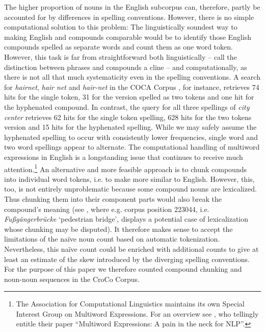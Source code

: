 \documentclass[output=paper]{LSP/langsci}
\begin{document}
\largerpage%
The higher proportion of nouns in the English subcorpus can, therefore, partly be accounted for by differences in spelling conventions. However, there is no simple computational solution to this problem: The linguistically soundest way to making English and  compounds comparable would be to identify those English compounds spelled as separate words and count them as one word token. However, this task is far from straightforward both linguistically -- \citet[589]{Biber1999} call the distinction between phrases and compounds a cline -- and computationally, as there is not all that much systematicity even in the spelling conventions. A search for \textit{hairnet}, \textit{hair net} and \textit{hair-net} in the COCA Corpus \citep[ongoing]{Davies2008}, for instance, retrieves 74 hits for the single token, 31 for the version spelled as two tokens and one hit for the hyphenated compound. In contrast, the query for all three spellings of \textit{city center} retrieves 62 hits for the single token spelling, 628 hits for the two tokens version and 15 hits for the hyphenated spelling. While we may safely assume the hyphenated spelling to occur with consistently lower frequencies, single word and two word spellings appear to alternate. The computational handling of multiword expressions in English is a longstanding issue that continues to receive much attention.\footnote{The Association for Computational Linguistics maintains its own Special Interest Group on Multiword Expressions. For an overview see \citet{Sag2002}, who tellingly entitle their paper ``Multiword Expressions: A pain in the neck for NLP''.} An alternative and more feasible approach is to chunk compounds into individual word tokens, i.e. to make  more similar to English. However, this, too, is not entirely unproblematic because some compound nouns are lexicalized. Thus chunking them into their component parts would also break the compound's meaning (see , where e.g. corpus position 223044, i.e. \textit{Fußgängerbrücke} `pedestrian bridge', displays a potential case of lexicalization whose chunking may be disputed). It therefore makes sense to accept the limitations of the naïve noun count based on automatic tokenization. Nevertheless, this naïve count could be enriched with additional counts to give at least an estimate of the skew introduced by the diverging spelling conventions. For the purpose of this paper we therefore counted compound chunking and noun-noun sequences in the CroCo Corpus. 
\end{document}
